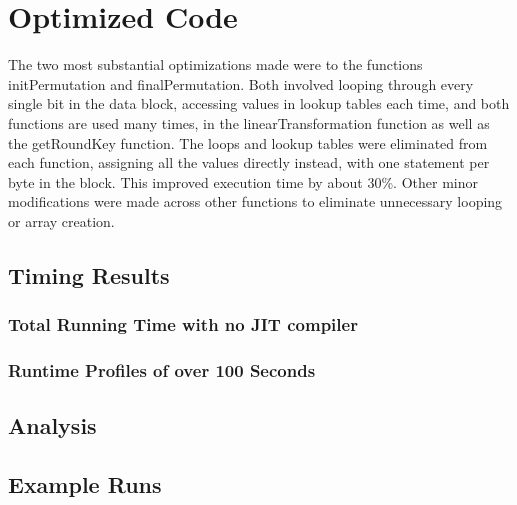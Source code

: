 \documentclass[12pt]{article} %
\begin{document}
\section{Optimized Code}
The two most substantial optimizations made were to the functions initPermutation and finalPermutation. Both involved looping through every single bit in the data block, accessing values in lookup tables each time, and both functions are used many times, in the linearTransformation function as well as the getRoundKey function. The loops and lookup tables were eliminated from each function, assigning all the values directly instead, with one statement per byte in the block. This improved execution time by about 30\%. Other minor modifications were made across other functions to eliminate unnecessary looping or array creation.
\subsection{Timing Results}
\subsubsection{Total Running Time with no JIT compiler}
\subsubsection{Runtime Profiles of over 100 Seconds}
\subsection{Analysis}
\subsection{Example Runs}
\end{document}
